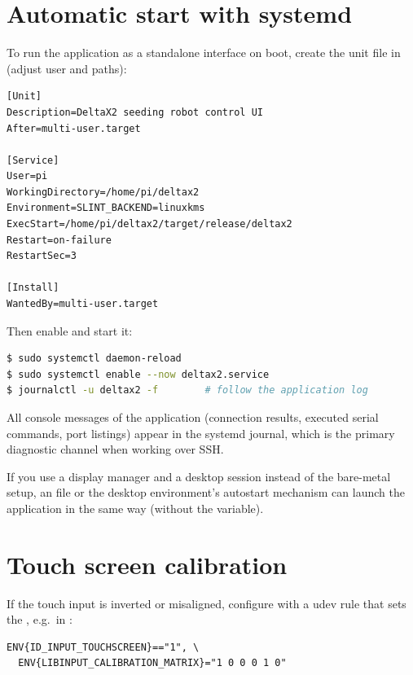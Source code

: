 \section{Automatic start with systemd}
\label{sec:systemd}

To run the application as a standalone interface on boot, create the unit file
 in  (adjust user and paths):

\begin{lstlisting}
[Unit]
Description=DeltaX2 seeding robot control UI
After=multi-user.target

[Service]
User=pi
WorkingDirectory=/home/pi/deltax2
Environment=SLINT_BACKEND=linuxkms
ExecStart=/home/pi/deltax2/target/release/deltax2
Restart=on-failure
RestartSec=3

[Install]
WantedBy=multi-user.target
\end{lstlisting}

Then enable and start it:

\begin{lstlisting}[language=bash]
$ sudo systemctl daemon-reload
$ sudo systemctl enable --now deltax2.service
$ journalctl -u deltax2 -f        # follow the application log
\end{lstlisting}

All console messages of the application (connection results, executed serial
commands, port listings) appear in the systemd journal, which is the primary
diagnostic channel when working over SSH.

If you use a display manager and a desktop session instead of the bare-metal
 setup, an  file or the desktop environment's
autostart mechanism can launch the application in the same way (without the
 variable).

\section{Touch screen calibration}
\label{sec:touchcal}

If the touch input is inverted or misaligned, configure  with a udev
rule that sets the , e.g.\ in
:

\begin{lstlisting}
ENV{ID_INPUT_TOUCHSCREEN}=="1", \
  ENV{LIBINPUT_CALIBRATION_MATRIX}="1 0 0 0 1 0"
\end{lstlisting}

